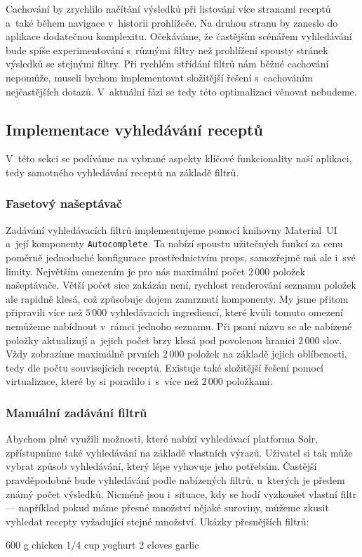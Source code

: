 Cachování by zrychlilo načítání výsledků při listování více stranami receptů a~také během navigace v~historii prohlížeče. Na druhou stranu by zaneslo do aplikace dodatečnou komplexitu. Očekáváme, že častějším scénářem vyhledávání bude spíše experimentování s~různými filtry než prohlížení spousty stránek výsledků se stejnými filtry. Při rychlém střídání filtrů nám běžné cachování nepomůže, museli bychom implementovat složitější řešení s~cachováním nejčastějších dotazů. V~aktuální fázi se tedy této optimalizaci věnovat nebudeme.

\subsection{Implementace vyhledávání receptů}

V~této sekci se podíváme na vybrané aspekty klíčové funkcionality naší aplikaci, tedy samotného vyhledávání receptů na základě filtrů.

\subsubsection{Fasetový našeptávač}

Zadávání vyhledávacích filtrů implementujeme pomocí knihovny Material~UI a~její komponenty \texttt{Autocomplete}. Ta nabízí spoustu užitečných funkcí za cenu poměrně jednoduché konfigurace prostřednictvím props, samozřejmě má ale i~své limity. Největším omezením je pro nás maximální počet $2\,000$ položek našeptávače. Větší počet sice zakázán není, rychlost renderování seznamu položek ale rapidně klesá, což způsobuje dojem zamrznutí komponenty. My jsme přitom připravili více než $5\,000$ vyhledávacích ingrediencí, které kvůli tomuto omezení nemůžeme nabídnout v~rámci jednoho seznamu. Při psaní názvu se ale nabízené položky aktualizují a~jejich počet brzy klesá pod povolenou hranici $2\,000$ slov. Vždy zobrazíme maximálně prvních $2\,000$ položek na základě jejich oblíbenosti, tedy dle počtu souvisejících receptů. Existuje také složitější řešení pomocí virtualizace, které by si poradilo i~s~více než $2\,000$ položkami.

\subsubsection{Manuální zadávání filtrů}

Abychom plně využili možnosti, které nabízí vyhledávací platforma Solr, zpřístupníme také vyhledávání na základě vlastních výrazů. Uživatel si tak může vybrat způsob vyhledávání, který lépe vyhovuje jeho potřebám. Častější pravděpodobně bude vyhledávání podle nabízených filtrů, u~kterých je předem známý počet výsledků. Nicméně jsou i~situace, kdy se hodí vyzkoušet vlastní filtr --- například pokud máme přesné množství nějaké suroviny, můžeme zkusit vyhledat recepty vyžadující stejné množství. Ukázky přesnějších filtrů:
\begin{code}
600 g chicken
1/4 cup yoghurt
2 cloves garlic
\end{code}

